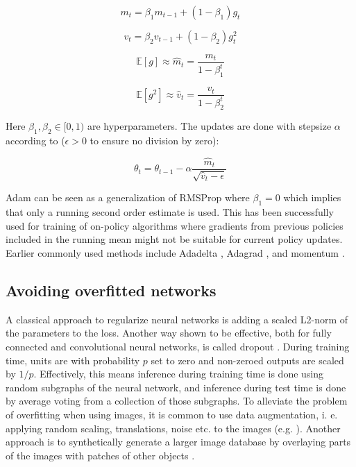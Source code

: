 \begin{equation}
    m_t = \beta_1 m_{t-1} + (1 - \beta_1) g_t
\end{equation}

\begin{equation}
    v_t = \beta_2 v_{t-1} + (1 - \beta_2) g_t^2
\end{equation}

\begin{equation}
    \mathbb{E}\left[g \right] \approx \hat{m}_t = \frac{m_t}{1- \beta_1^t}
\end{equation}

\begin{equation}
    \mathbb{E}\left[g^2 \right] \approx \hat{v}_t = \frac{v_t}{1- \beta_2^t}
\end{equation}

Here $\beta_1, \beta_2 \in [0, 1)$ are hyperparameters. The updates are done
with stepsize $\alpha$ according to ($\epsilon >0$ to ensure no division by zero):

\begin{equation}
    \theta_t = \theta_{t-1} - \alpha \frac{\hat{m}_t}{\sqrt{\hat{v}_t - \epsilon}}
\end{equation}

Adam can be seen as a generalization of RMSProp where $\beta_1 = 0$
\cite{tieleman2012lecture} which implies that only a running second order
estimate is used. This has been successfully used for training of on-policy
algorithms \cite{mnih2016asynchronous} where gradients from previous policies
included in the running mean might not be suitable for current policy updates.
Earlier commonly used methods include Adadelta \cite{zeiler2012adadelta},
Adagrad \cite{duchi2011adaptive}, and momentum \cite{qian1999momentum}.


\subsection{Avoiding overfitted networks}

A classical approach to regularize neural networks is adding a scaled L2-norm
of the parameters to the loss. Another way shown to be effective, both for
fully connected and convolutional neural networks, is called dropout
\cite{srivastava2014dropout}. During training time, units are with probability
$p$ set to zero and non-zeroed outputs are scaled by $1/p$. Effectively, this
means inference during training time is done using random subgraphs of the
neural network, and inference during test time is done by average voting from a
collection of those subgraphs. To alleviate the problem of overfitting when
using images, it is common to use data augmentation, i. e. applying random
scaling, translations, noise etc. to the images (e.g.
\cite{ciregan2012multi,simard2003best,krizhevsky2012imagenet}). Another
approach is to synthetically generate a larger image database by overlaying
parts of the images with patches of other objects \cite{ghadirzadeh2017deep}.

